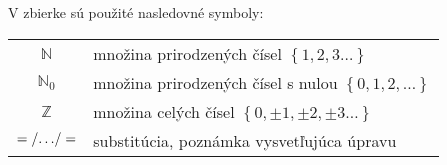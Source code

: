 V zbierke sú použité nasledovné symboly:
\begin{center}
\begin{tabular}{cl}
$\mathbb{N}$ & množina prirodzených čísel $\left\{1,2,3\ldots\right\}$\\
$\mathbb{N}_0$ & množina prirodzených čísel s nulou $\left\{0,1,2,\ldots\right\}$\\
$\mathbb{Z}$ & množina celých čísel $\left\{0,\pm1,\pm2,\pm3\ldots\right\}$\\
$=\left/\ldots\right/=$ & substitúcia, poznámka vysvetľujúca úpravu
\end{tabular}
\end{center}
